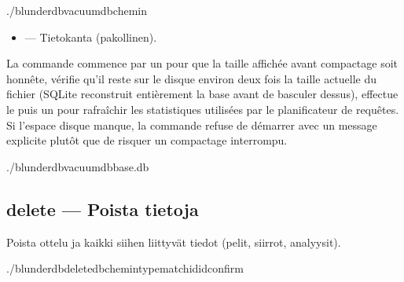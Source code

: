 \documentclass[letterpaper,10pt,finnish]{sphinxmanual}
\begin{document}
\begin{sphinxVerbatim}[commandchars=\\\{\}]
./blunderdbvacuum\PYGZhy{}\PYGZhy{}db\PYGZlt{}chemin\PYGZgt{}
\end{sphinxVerbatim}

\sphinxAtStartPar
{}
\begin{itemize}
\item {} 
\sphinxAtStartPar
{} — Tietokanta (pakollinen).

\end{itemize}

\sphinxAtStartPar
La commande commence par un  pour que la taille
affichée avant compactage soit honnête, vérifie qu’il reste sur le disque
environ deux fois la taille actuelle du fichier (SQLite reconstruit
entièrement la base avant de basculer dessus), effectue le  puis un
 pour rafraîchir les statistiques utilisées par le planificateur de
requêtes. Si l’espace disque manque, la commande refuse de démarrer avec un
message explicite plutôt que de risquer un compactage interrompu.

\sphinxAtStartPar
{}

\begin{sphinxVerbatim}[commandchars=\\\{\}]
./blunderdbvacuum\PYGZhy{}\PYGZhy{}dbbase.db

\end{sphinxVerbatim}


\subsection{delete — Poista tietoja}
\label{\detokenize{cli:delete-supprimer-des-donnees}}
\sphinxAtStartPar
Poista ottelu ja kaikki siihen liittyvät tiedot (pelit, siirrot, analyysit).

\begin{sphinxVerbatim}[commandchars=\\\{\}]
./blunderdbdelete\PYGZhy{}\PYGZhy{}db\PYGZlt{}chemin\PYGZgt{}\PYGZhy{}\PYGZhy{}typematch\PYGZhy{}\PYGZhy{}id\PYGZlt{}id\PYGZgt{}\PYG{o}{[}\PYGZhy{}\PYGZhy{}confirm\PYG{o}{]}
\end{sphinxVerbatim}
\end{document}

